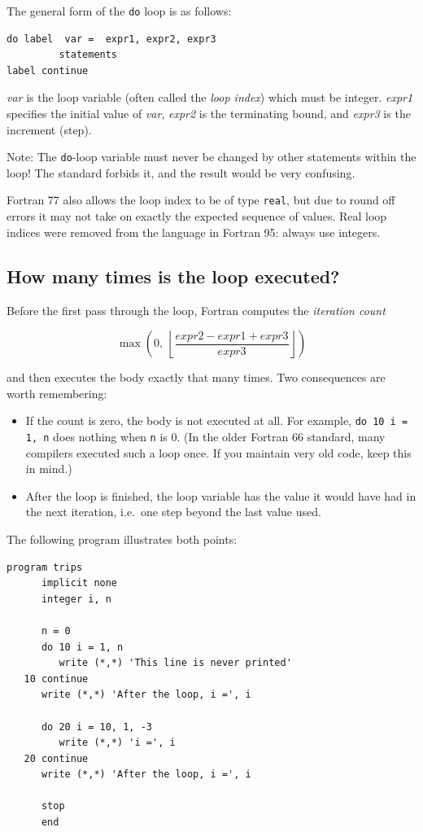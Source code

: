 The general form of the \texttt{do} loop is as follows:

\begin{lstlisting}[style=fortran77]
      do label  var =  expr1, expr2, expr3
         statements
label continue
\end{lstlisting}

\emph{var} is the loop variable (often called the \emph{loop index}) which must be integer. \emph{expr1} specifies the initial value of \emph{var}, \emph{expr2} is the terminating bound, and \emph{expr3} is the increment (step).

Note: The \texttt{do}-loop variable must never be changed by other statements within the loop! The standard forbids it, and the result would be very confusing.

Fortran 77 also allows the loop index to be of type \texttt{real}, but due to round off errors it may not take on exactly the expected sequence of values. Real loop indices were removed from the language in Fortran 95: always use integers.

\subsection{How many times is the loop executed?}

Before the first pass through the loop, Fortran computes the \emph{iteration count}

\[
    \max\left(0,\ \left\lfloor \frac{expr2 - expr1 + expr3}{expr3} \right\rfloor\right)
\]

and then executes the body exactly that many times. Two consequences are worth remembering:

\begin{itemize}
    \item If the count is zero, the body is not executed at all. For example, \texttt{do 10 i = 1, n} does nothing when \texttt{n} is 0. (In the older Fortran 66 standard, many compilers executed such a loop once. If you maintain very old code, keep this in mind.)
    \item After the loop is finished, the loop variable has the value it would have had in the next iteration, i.e.\ one step beyond the last value used.
\end{itemize}

The following program illustrates both points:

\begin{lstlisting}[style=fortran77]
      program trips
      implicit none
      integer i, n

      n = 0
      do 10 i = 1, n
         write (*,*) 'This line is never printed'
   10 continue
      write (*,*) 'After the loop, i =', i

      do 20 i = 10, 1, -3
         write (*,*) 'i =', i
   20 continue
      write (*,*) 'After the loop, i =', i

      stop
      end
\end{lstlisting}

